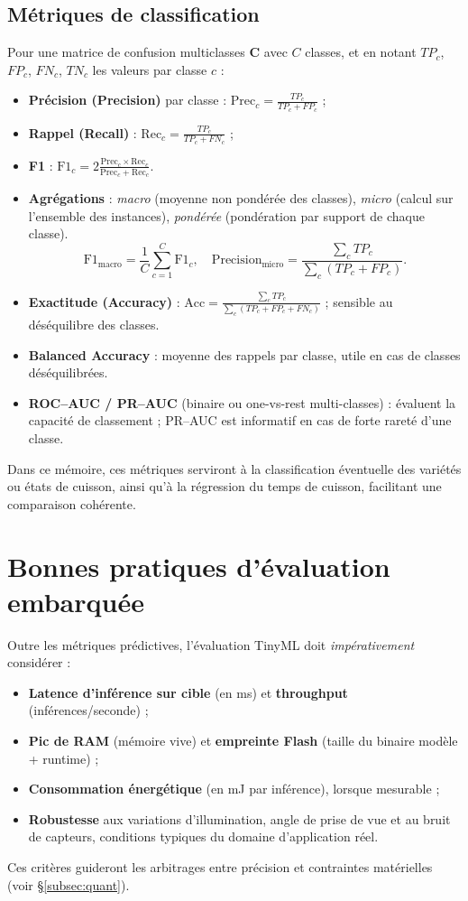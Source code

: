 \subsection{Métriques de classification}
Pour une matrice de confusion multiclasses \(\mathbf{C}\) avec \(C\) classes, et en notant \(TP_c\), \(FP_c\), \(FN_c\), \(TN_c\) les valeurs par classe \(c\) :
\begin{itemize}
    \item \textbf{Précision (Precision)} par classe : \(\mathrm{Prec}_c = \frac{TP_c}{TP_c + FP_c}\) ; 
    \item \textbf{Rappel (Recall)} : \(\mathrm{Rec}_c = \frac{TP_c}{TP_c + FN_c}\) ; 
    \item \textbf{F1} : \(\mathrm{F1}_c = 2 \frac{\mathrm{Prec}_c \times \mathrm{Rec}_c}{\mathrm{Prec}_c + \mathrm{Rec}_c}\).
    \item \textbf{Agrégations} : \emph{macro} (moyenne non pondérée des classes), \emph{micro} (calcul sur l’ensemble des instances), \emph{pondérée} (pondération par support de chaque classe).
          \[
              \mathrm{F1}_{\text{macro}} = \frac{1}{C} \sum_{c=1}^C \mathrm{F1}_c, \quad \mathrm{Precision}_{\text{micro}} = \frac{\sum_c TP_c}{\sum_c (TP_c + FP_c)}.
          \]
    \item \textbf{Exactitude (Accuracy)} : \(\mathrm{Acc} = \frac{\sum_c TP_c}{\sum_c (TP_c + FP_c + FN_c)}\) ; sensible au déséquilibre des classes.
    \item \textbf{Balanced Accuracy} : moyenne des rappels par classe, utile en cas de classes déséquilibrées.
    \item \textbf{ROC–AUC / PR–AUC} (binaire ou one-vs-rest multi-classes) : évaluent la capacité de classement ; PR–AUC est informatif en cas de forte rareté d’une classe.
\end{itemize}
Dans ce mémoire, ces métriques serviront à la classification éventuelle des variétés ou états de cuisson, ainsi qu’à la régression du temps de cuisson, facilitant une comparaison cohérente.

\section{Bonnes pratiques d’évaluation embarquée}
Outre les métriques prédictives, l’évaluation TinyML doit \emph{impérativement} considérer :
\begin{itemize}
    \item \textbf{Latence d’inférence sur cible} (en ms) et \textbf{throughput} (inférences/seconde) ;
    \item \textbf{Pic de RAM} (mémoire vive) et \textbf{empreinte Flash} (taille du binaire modèle + runtime) ;
    \item \textbf{Consommation énergétique} (en mJ par inférence), lorsque mesurable ;
    \item \textbf{Robustesse} aux variations d’illumination, angle de prise de vue et au bruit de capteurs, conditions typiques du domaine d’application réel.
\end{itemize}
Ces critères guideront les arbitrages entre précision et contraintes matérielles (voir \S\ref{subsec:quant}).

